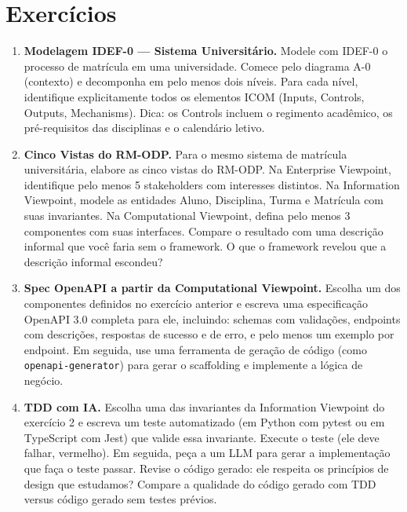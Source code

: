\section*{Exercícios}

\begin{enumerate}
    \item \textbf{Modelagem IDEF-0 --- Sistema Universitário.}
    Modele com IDEF-0 o processo de matrícula em uma universidade. Comece pelo
    diagrama A-0 (contexto) e decomponha em pelo menos dois níveis. Para cada
    nível, identifique explicitamente todos os elementos ICOM (Inputs, Controls,
    Outputs, Mechanisms). Dica: os Controls incluem o regimento acadêmico, os
    pré-requisitos das disciplinas e o calendário letivo.

    \item \textbf{Cinco Vistas do RM-ODP.}
    Para o mesmo sistema de matrícula universitária, elabore as cinco vistas do
    RM-ODP. Na Enterprise Viewpoint, identifique pelo menos 5 stakeholders com
    interesses distintos. Na Information Viewpoint, modele as entidades Aluno,
    Disciplina, Turma e Matrícula com suas invariantes. Na Computational
    Viewpoint, defina pelo menos 3 componentes com suas interfaces. Compare
    o resultado com uma descrição informal que você faria sem o framework.
    O que o framework revelou que a descrição informal escondeu?

    \item \textbf{Spec OpenAPI a partir da Computational Viewpoint.}
    Escolha um dos componentes definidos no exercício anterior e escreva uma
    especificação OpenAPI 3.0 completa para ele, incluindo: schemas com
    validações, endpoints com descrições, respostas de sucesso e de erro,
    e pelo menos um exemplo por endpoint. Em seguida, use uma ferramenta
    de geração de código (como \texttt{openapi-generator}) para gerar o
    scaffolding e implemente a lógica de negócio.

    \item \textbf{TDD com IA.}
    Escolha uma das invariantes da Information Viewpoint do exercício 2 e
    escreva um teste automatizado (em Python com pytest ou em TypeScript
    com Jest) que valide essa invariante. Execute o teste (ele deve falhar,
    vermelho). Em seguida, peça a um LLM para gerar a implementação
    que faça o teste passar. Revise o código gerado: ele respeita os
    princípios de design que estudamos? Compare a qualidade do código
    gerado com TDD versus código gerado sem testes prévios.


\end{enumerate}
